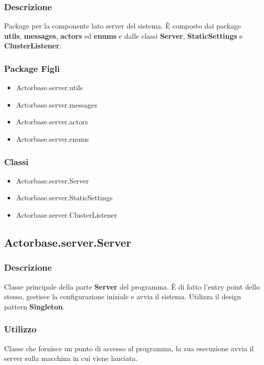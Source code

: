 \documentclass[a4paper]{article}
\begin{document}
			\subsubsection{Descrizione}
				Package per la componente lato server del sistema. 
				È composto dai package \textbf{utils}, \textbf{messages}, \textbf{actors} ed \textbf{enums} e dalle classi \textbf{Server}, \textbf{StaticSettings} e \textbf{ClusterListener}.\\
				
			\subsubsection{Package Figli}
				\begin{itemize}
					\item Actorbase.server.utils
					\item Actorbase.server.messages
					\item Actorbase.server.actors
					\item Actorbase.server.enums
				\end{itemize}
				
			\subsubsection{Classi}
				\begin{itemize}
					\item Actorbase.server.Server
					\item Actorbase.server.StaticSettings
					\item Actorbase.server.ClusterListener
				\end{itemize}
				
		\subsection{Actorbase.server.Server}
			\subsubsection{Descrizione}
				Classe principale della parte \textbf{Server} del programma. È di fatto l'entry point dello stesso, gestisce la configurazione 
				iniziale e avvia il sistema. Utilizza il design pattern \textbf{Singleton}.
				
			\subsubsection{Utilizzo}
				Classe che fornisce un punto di accesso al programma, la sua esecuzione avvia il server sulla macchina in cui viene lanciata.
				
\end{document}
